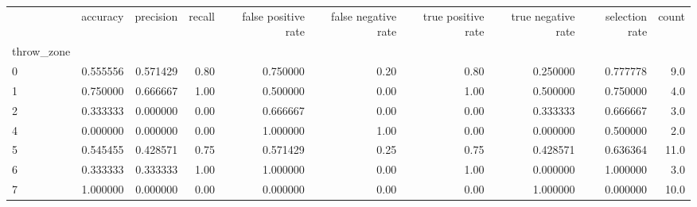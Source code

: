\begin{tabular}{lrrrrrrrrr}
\toprule
{} &  accuracy &  precision &  recall &  false positive rate &  false negative rate &  true positive rate &  true negative rate &  selection rate &  count \\
throw\_zone &           &            &         &                      &                      &                     &                     &                 &        \\
\midrule
0          &  0.555556 &   0.571429 &    0.80 &             0.750000 &                 0.20 &                0.80 &            0.250000 &        0.777778 &    9.0 \\
1          &  0.750000 &   0.666667 &    1.00 &             0.500000 &                 0.00 &                1.00 &            0.500000 &        0.750000 &    4.0 \\
2          &  0.333333 &   0.000000 &    0.00 &             0.666667 &                 0.00 &                0.00 &            0.333333 &        0.666667 &    3.0 \\
4          &  0.000000 &   0.000000 &    0.00 &             1.000000 &                 1.00 &                0.00 &            0.000000 &        0.500000 &    2.0 \\
5          &  0.545455 &   0.428571 &    0.75 &             0.571429 &                 0.25 &                0.75 &            0.428571 &        0.636364 &   11.0 \\
6          &  0.333333 &   0.333333 &    1.00 &             1.000000 &                 0.00 &                1.00 &            0.000000 &        1.000000 &    3.0 \\
7          &  1.000000 &   0.000000 &    0.00 &             0.000000 &                 0.00 &                0.00 &            1.000000 &        0.000000 &   10.0 \\
\bottomrule
\end{tabular}
